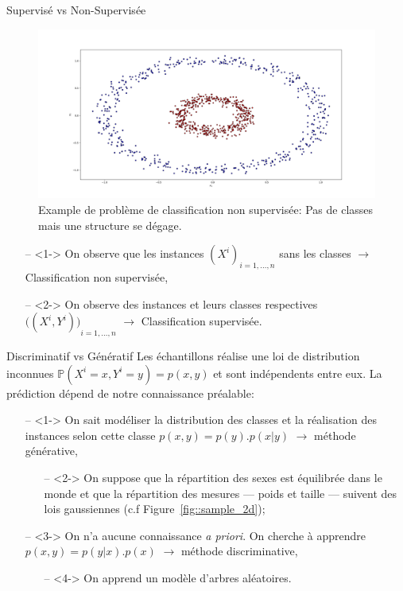 \documentclass[9pt]{beamer}
\begin{document}
	\begin{frame}{Supervisé vs Non-Supervisée}
		\begin{figure}[H]
			\begin{center}
				\includegraphics[width=.7\textwidth]{circles}
				\caption{\label{fig::circles} Example de problème de classification non supervisée: Pas de classes mais une structure se dégage.}
			\end{center}
		\end{figure}
		\begin{itemize}
			\item[--]<1-> On observe que les instances ${(X^i)}_{i=1,\dots,n}$ sans les classes $\longrightarrow$ Classification non supervisée,
			\item[--]<2-> On observe des instances et leurs classes respectives ${\Big((X^i, Y^i)\Big)}_{i=1,\dots,n}$ $\longrightarrow$ Classification supervisée.
		\end{itemize}
	\end{frame}

	\begin{frame}{Discriminatif vs Génératif}
		Les échantillons réalise une loi de distribution inconnues $\mathbb{P}(X^i=x,Y^i=y)=p(x,y)$ et sont indépendents entre eux. La prédiction dépend de notre connaissance préalable:
		\begin{itemize}
			\item[--]<1-> On sait modéliser la distribution des classes et la réalisation des instances selon cette classe $p(x,y) = p(y).p(x\vert y)$ $\longrightarrow$ méthode générative,
			\begin{itemize}
				\item[--]<2-> On suppose que la répartition des sexes est équilibrée dans le monde et que la répartition des mesures --- poids et taille --- suivent des lois gaussiennes (c.f Figure~\ref{fig::sample_2d});
			\end{itemize}
			\item[--]<3-> On n'a aucune connaissance \textit{a priori}. On cherche à apprendre $ p(x,y) = p(y \vert x).p(x)$ $\longrightarrow$ méthode discriminative,
			\begin{itemize}
				\item[--]<4-> On apprend un modèle d'arbres aléatoires.
			\end{itemize}
		\end{itemize}
	\end{frame}
\end{document}
